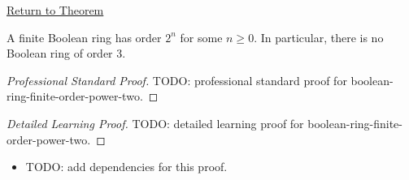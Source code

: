 \newpage
{}
\label{prf:boolean-ring-finite-order-power-two}

\begin{remark*}[Return]
\hyperref[cor:boolean-ring-finite-order-power-two]{Return to Theorem}
\end{remark*}

\begin{corollary*}
A finite Boolean ring has order $2^n$ for some $n\geq 0$. In particular,
there is no Boolean ring of order $3$.
\end{corollary*}

\begin{proof}[Professional Standard Proof]
\LRAProofBodyStart
TODO: professional standard proof for boolean-ring-finite-order-power-two.
\end{proof}

\begin{proof}[Detailed Learning Proof]
\LRAProofBodyStart
TODO: detailed learning proof for boolean-ring-finite-order-power-two.
\end{proof}

\begin{remark*}
\end{remark*}

\begin{dependencies}
\begin{itemize}
  \item TODO: add dependencies for this proof.
\end{itemize}
\end{dependencies}

\clearpage
